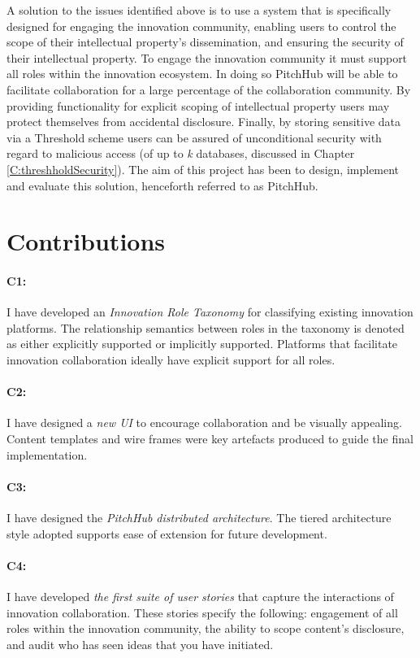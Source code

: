 A solution to the issues identified above is to use a system that is specifically designed for engaging the innovation community, enabling users to control the scope of their intellectual property's dissemination, and ensuring the security of their intellectual property. To engage the innovation community it must support all roles within the innovation ecosystem. In doing so PitchHub will be able to facilitate collaboration for a large percentage of the collaboration community. By providing functionality for explicit scoping of intellectual property users may protect themselves from accidental disclosure. Finally, by storing sensitive data via a Threshold scheme users can be assured of unconditional security with regard to malicious access (of up to \textit{k} databases, discussed in Chapter \ref{C:threshholdSecurity}).
The aim of this project has been to design, implement and evaluate this solution, henceforth referred to as PitchHub.

\section{Contributions}

\paragraph{C1:} I have developed an {\em Innovation Role Taxonomy} for classifying existing innovation platforms. The relationship semantics between roles in the taxonomy is denoted as either explicitly supported or implicitly supported. Platforms that facilitate innovation collaboration ideally have explicit support for all roles.

\paragraph{C2:} I have designed a {\em new UI} to encourage collaboration and be visually appealing. Content templates and wire frames were key artefacts produced to guide the final implementation.

\paragraph{C3:} I have designed the {\em PitchHub distributed architecture}. The tiered architecture style adopted supports ease of extension for future development.

\paragraph{C4:} I have developed {\em the first suite of user stories} that capture the interactions of innovation collaboration. These stories specify the following: engagement of all roles within the innovation community, the ability to scope content's disclosure, and audit who has seen ideas that you have initiated.

